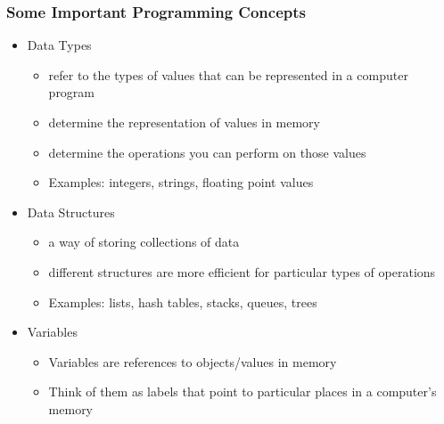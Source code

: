 \documentclass{beamer}
\begin{document}
\begin{frame}
  \frametitle{Some Important Programming Concepts}
\begin{itemize}

\item Data Types
\begin{itemize}
	\item refer to the types of values that can be represented in a computer program
	\item determine the representation of values in memory
	\item determine the operations you can perform on those values
	\item Examples: integers, strings, floating point values
\end{itemize}

\item Data Structures
\begin{itemize}
	\item a way of storing collections of data
	\item different structures are more efficient for particular types of operations
	\item Examples: lists, hash tables, stacks, queues, trees
\end{itemize}

\item Variables
\begin{itemize}
	\item Variables are references to objects/values in memory
	\item Think of them as labels that point to particular places in a computer's memory
\end{itemize}


\end{itemize}

\end{frame}
\end{document}
